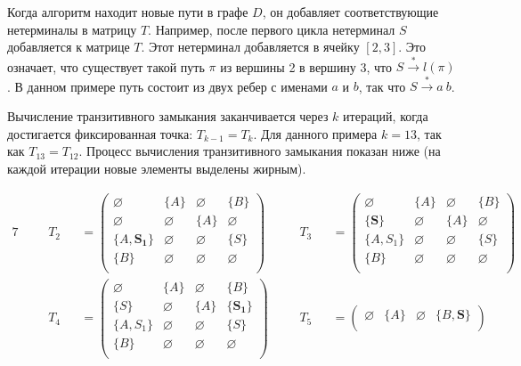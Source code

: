 \begin{example}
Когда алгоритм находит новые пути в графе $D$, он добавляет соответствующие нетерминалы в матрицу $T$. Например, после первого цикла нетерминал $S$ добавляется к матрице $T$. Этот нетерминал добавляется в ячейку $[2,3]$. Это означает, что существует такой путь $\pi$ из вершины 2 в вершину 3, что $S \xrightarrow{*} l(\pi)$. В данном примере путь состоит из двух ребер с именами $a$ и $b$, так что $S \xrightarrow{*} a \ b$.

Вычисление транзитивного замыкания заканчивается через $k$ итераций, когда достигается фиксированная точка: $T_{k-1} = T_k$. Для данного примера $k = 13$, так как $T_{13} = T_{12}$. Процесс вычисления транзитивного замыкания показан ниже (на каждой итерации новые элементы выделены жирным).


\begin{alignat*}{7}
& &&T_2 &&= \begin{pmatrix}
\varnothing & \{A\}       & \varnothing & \{B\}       \\
\varnothing & \varnothing & \{A\}       & \varnothing \\
\{A, \pmb{S_1}\}  & \varnothing & \varnothing & \{S\}       \\
\{B\}       & \varnothing & \varnothing & \varnothing \\
\end{pmatrix} \ \ \ \ &&T_3 &&= \begin{pmatrix}
\varnothing & \{A\}       & \varnothing & \{B\}       \\
\{\pmb{S}\}       & \varnothing & \{A\}       & \varnothing \\
\{A, S_1\}  & \varnothing & \varnothing & \{S\}       \\
\{B\}       & \varnothing & \varnothing & \varnothing \\
\end{pmatrix} \\ & &&T_4 &&= \begin{pmatrix}
\varnothing & \{A\}       & \varnothing & \{B\}       \\
\{S\}       & \varnothing & \{A\}       & \{\pmb{S_1}\}     \\
\{A, S_1\}  & \varnothing & \varnothing & \{S\}       \\
\{B\}       & \varnothing & \varnothing & \varnothing \\
\end{pmatrix}  \ \ \ \ &&T_5 &&= \begin{pmatrix}
\varnothing & \{A\}       & \varnothing & \{B, \pmb{S}\}    \\

\end{pmatrix}
\end{alignat*}
\end{example}
